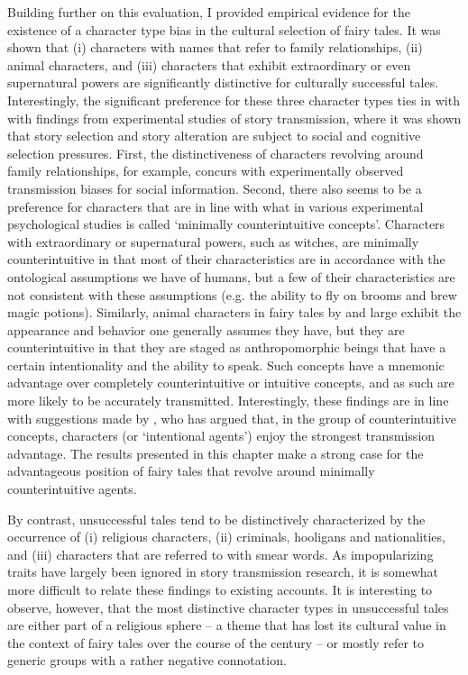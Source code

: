 Building further on this evaluation, I provided empirical evidence for the existence of a character type bias in the cultural selection of fairy tales. It was shown that (i) characters with names that refer to family relationships, (ii) animal characters, and (iii) characters that exhibit extraordinary or even supernatural powers are significantly distinctive for culturally successful tales. Interestingly, the significant preference for these three character types ties in with with findings from experimental studies of story transmission, where it was shown that story selection and story alteration are subject to social and cognitive selection pressures\autocite[See e.g.][]{owens:1979,diehl:2006,mesoudiwhiten:2008,eriksson:2012}. First, the distinctiveness of characters revolving around family relationships, for example, concurs with experimentally observed transmission biases for social information\autocite[See e.g.][]{mesoudi:2006}. Second, there also seems to be a preference for characters that are in line with what in various experimental psychological studies is called `minimally counterintuitive concepts'. Characters with extraordinary or supernatural powers, such as witches, are minimally counterintuitive in that most of their characteristics are in accordance with the ontological assumptions we have of humans, but a few of their characteristics are not consistent with these assumptions (e.g.\/ the ability to fly on brooms and brew magic potions). Similarly, animal characters in fairy tales by and large exhibit the appearance and behavior one generally assumes they have, but they are counterintuitive in that they are staged as anthropomorphic beings that have a certain intentionality and the ability to speak.\autocite[Cf.][]{Barrett:2008} Such concepts have a mnemonic advantage over completely counterintuitive or intuitive concepts, and as such are more likely to be accurately transmitted.\autocite[See e.g.][]{barrett:2004,Norenzayan:2006,Upal:2007,HarmonVukic:2009,Barrett:2009,Upal:2011} Interestingly, these findings are in line with suggestions made by \citeauthor{boyer:2001}, who has argued that, in the group of counterintuitive concepts, characters (or `intentional agents') enjoy the strongest transmission advantage\autocite{boyer:2001}. The results presented in this chapter make a strong case for the advantageous position of fairy tales that revolve around minimally counterintuitive agents. 

By contrast, unsuccessful tales tend to be distinctively characterized by the occurrence of (i) religious characters, (ii) criminals, hooligans and nationalities, and (iii) characters that are referred to with smear words. As impopularizing traits have largely been ignored in story transmission research, it is somewhat more difficult to relate these findings to existing accounts. It is interesting to observe, however, that the most distinctive character types in unsuccessful tales are either part of a religious sphere -- a theme that has lost its cultural value in the context of fairy tales over the course of the  century -- or mostly refer to generic groups with a rather negative connotation.

